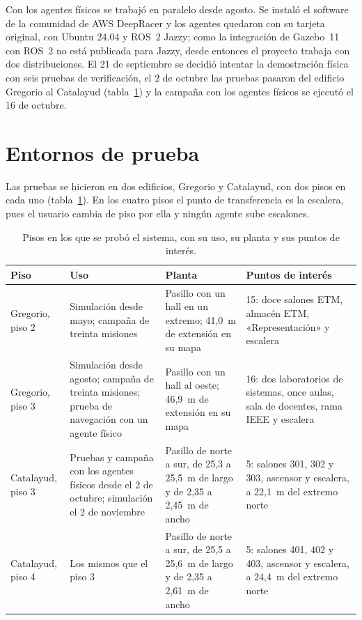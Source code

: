 Con los agentes físicos se trabajó en paralelo desde agosto. Se instaló el software de la comunidad de AWS DeepRacer \autocite{deepracercustomcar} y los agentes quedaron con su tarjeta original, con Ubuntu 24.04 y ROS~2 Jazzy; como la integración de Gazebo~11 con ROS~2 no está publicada para Jazzy, desde entonces el proyecto trabaja con dos distribuciones. El 21 de septiembre se decidió intentar la demostración física con seis pruebas de verificación, el 2 de octubre las pruebas pasaron del edificio Gregorio al Catalayud (tabla~\ref{tab:entornos}) y la campaña con los agentes físicos se ejecutó el 16 de octubre.

\section{Entornos de prueba}
\label{sec:entornos}

Las pruebas se hicieron en dos edificios, Gregorio y Catalayud, con dos pisos en cada uno (tabla~\ref{tab:entornos}). En los cuatro pisos el punto de transferencia es la escalera, pues el usuario cambia de piso por ella y ningún agente sube escalones.

\begin{table}[H]
  \centering\footnotesize
  \caption{Pisos en los que se probó el sistema, con su uso, su planta y sus puntos de interés.}
  \label{tab:entornos}
  \begin{tabular}{@{}p{}p{}p{}p{}@{}}
    \toprule
    \textbf{Piso} & \textbf{Uso} & \textbf{Planta} & \textbf{Puntos de interés} \\ \midrule
    Gregorio, piso 2 & Simulación desde mayo; campaña de treinta misiones & Pasillo con un hall en un extremo; 41,0~m de extensión en su mapa & 15: doce salones ETM, almacén ETM, «Representación» y escalera \\ \addlinespace
    Gregorio, piso 3 & Simulación desde agosto; campaña de treinta misiones; prueba de navegación con un agente físico & Pasillo con un hall al oeste; 46,9~m de extensión en su mapa & 16: dos laboratorios de sistemas, once aulas, sala de docentes, rama IEEE y escalera \\ \addlinespace
    Catalayud, piso 3 & Pruebas y campaña con los agentes físicos desde el 2 de octubre; simulación el 2 de noviembre & Pasillo de norte a sur, de 25,3 a 25,5~m de largo y de 2,35 a 2,45~m de ancho & 5: salones 301, 302 y 303, ascensor y escalera, a 22,1~m del extremo norte \\ \addlinespace
    Catalayud, piso 4 & Los mismos que el piso 3 & Pasillo de norte a sur, de 25,5 a 25,6~m de largo y de 2,35 a 2,61~m de ancho & 5: salones 401, 402 y 403, ascensor y escalera, a 24,4~m del extremo norte \\ \bottomrule
  \end{tabular}
\end{table}

